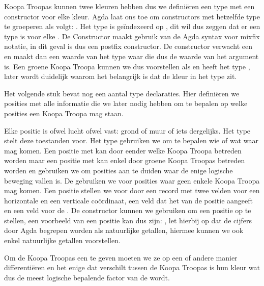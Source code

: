 
Koopa Troopas kunnen twee kleuren hebben dus we definiëren een type
 met een constructor voor elke kleur. Agda laat ons toe om
constructors met hetzelfde type te groeperen als volgt: . Het type  is geïndexeerd op , dit wil
dus zeggen dat er een type is voor elke . De Constructor maakt
gebruik van de Agda syntax voor mixfix notatie, in dit geval is  dus
een postfix constructor. De  constructor verwacht een
 en maakt dan een waarde van het type  waar
die  dus de waarde van het argument is. Een groene Koopa Troopa kunnen
we dus voorstellen als  en heeft het type , later wordt duidelijk waarom het belangrijk is dat de kleur in het type
zit.

Het volgende stuk bevat nog een aantal type declaraties. Hier definiëren we
posities met alle informatie die we later nodig hebben om te bepalen op welke
posities een Koopa Troopa mag staan.


Elke positie is ofwel lucht ofwel vast: grond of muur of iets dergelijks. Het
type  stelt deze toestanden voor. Het type 
gebruiken we om te bepalen wie of wat waar mag komen. Een positie met
  kan door eender welke Koopa Troopa betreden
worden maar een positie met   kan enkel door
groene Koopa Troopas betreden worden en gebruiken we om posities aan te duiden
waar de enige logische beweging vallen is. De 
 gebruiken we voor posities waar geen enkele Koopa Troopa mag
komen. Een positie stellen we voor door een record met twee velden voor een
horizontale en een verticale coördinaat, een veld dat het  van
de positie aangeeft en een veld voor de . De constructor
 kunnen we gebruiken om een positie op te stellen, een voorbeeld van
een positie kan dus zijn: , let hierbij op dat de
cijfers door Agda begrepen worden als natuurlijke getallen, hiermee kunnen we
ook enkel natuurlijke getallen voorstellen.

Om de Koopa Troopas een  te geven moeten we ze op een of
andere manier differentiëren en het enige dat verschilt tussen de Koopa Troopas
is hun kleur wat dus de meest logische bepalende factor van de
 wordt.

